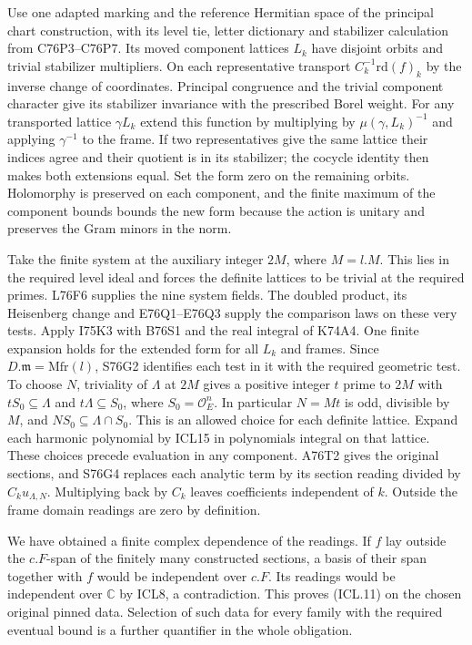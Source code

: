 Use one adapted marking and the reference Hermitian space of the
principal chart construction, with its level tie, letter dictionary
and stabilizer calculation from C76P3--C76P7. Its moved component lattices $L_k$
have disjoint orbits and trivial stabilizer multipliers. On each
representative transport $C_k^{-1}\mathrm{rd}(f)_k$ by the inverse
change of coordinates. Principal congruence and the trivial component
character give its stabilizer invariance with the prescribed Borel
weight. For any transported lattice $\gamma L_k$ extend this
function by multiplying by $\mu(\gamma,L_k)^{-1}$ and applying
$\gamma^{-1}$ to the frame. If two representatives give the same
lattice their indices agree and their quotient is in its stabilizer;
the cocycle identity then makes both extensions equal. Set the form
zero on the remaining orbits. Holomorphy is preserved on each
component, and the finite maximum of the component bounds bounds
the new form because the action is unitary and preserves the
Gram minors in the norm.

Take the finite system at the auxiliary integer $2M$, where
$M=l.M$. This lies in the required level ideal and forces the
definite lattices to be trivial at the required primes. L76F6
supplies the nine system fields. The doubled product, its
Heisenberg change and E76Q1--E76Q3 supply the comparison laws on
these very tests. Apply I75K3 with B76S1 and the real integral
of K74A4. One finite expansion holds for the extended form for
all $L_k$ and frames. Since $D.\mathfrak m=\mathrm{Mfr}(l)$,
S76G2 identifies each test in it with the required geometric
test. To choose $N$, triviality of $\Lambda$ at $2M$ gives a
positive integer $t$ prime to $2M$ with $tS_0\subseteq\Lambda$
and $t\Lambda\subseteq S_0$, where $S_0=\mathcal O_E^n$. In
particular $N=Mt$ is odd, divisible by $M$, and
$NS_0\subseteq\Lambda\cap S_0$. This is an allowed choice for
each definite lattice. Expand
each harmonic polynomial by ICL15 in polynomials integral on that
lattice. These choices precede evaluation in any component.
A76T2 gives the original sections, and S76G4 replaces each
analytic term by its section reading divided by $C_ku_{\Lambda,N}$.
Multiplying back by $C_k$ leaves coefficients independent of $k$.
Outside the frame domain readings are zero by definition.

We have obtained a finite complex dependence of the readings. If
$f$ lay outside the $c.F$-span of the finitely many constructed
sections, a basis of their span together with $f$ would be independent
over $c.F$. Its readings would be independent over $\mathbb C$ by
ICL8, a contradiction. This proves (ICL.11) on the chosen original
pinned data. Selection of such data for every family with the
required eventual bound is a further quantifier in the whole
obligation.
